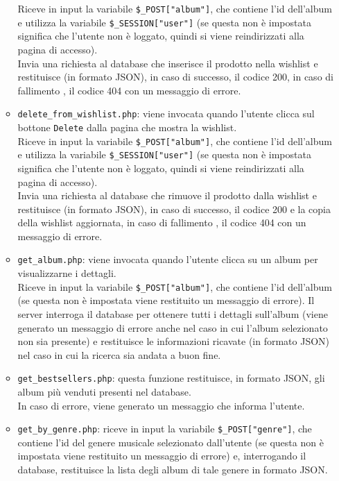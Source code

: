 \begin{itemize}
\begin{itemize}
            Riceve in input la variabile \texttt{\$\_POST["album"]}, che contiene l'id dell'album e utilizza la variabile \texttt{\$\_SESSION["user"]} (se questa non è impostata significa che l'utente non è loggato, quindi si viene reindirizzati alla pagina di accesso).\\
            Invia una richiesta al database che inserisce il prodotto nella wishlist e restituisce (in formato JSON), in caso di successo, il codice 200, in caso di fallimento , il codice 404 con un messaggio di errore.
            \item \texttt{delete\_from\_wishlist.php}: viene invocata quando l'utente clicca sul bottone \texttt{Delete} dalla pagina che mostra la wishlist.\\
             Riceve in input la variabile \texttt{\$\_POST["album"]}, che contiene l'id dell'album e utilizza la variabile \texttt{\$\_SESSION["user"]} (se questa non è impostata significa che l'utente non è loggato, quindi si viene reindirizzati alla pagina di accesso).\\
            Invia una richiesta al database che rimuove il prodotto dalla wishlist e restituisce (in formato JSON), in caso di successo, il codice 200 e la copia della wishlist aggiornata, in caso di fallimento , il codice 404 con un messaggio di errore.
            \item \texttt{get\_album.php}: viene invocata quando l'utente clicca su un album per visualizzarne i dettagli.\\
            Riceve in input la variabile \texttt{\$\_POST["album"]}, che contiene l'id dell'album (se questa non è impostata viene restituito un messaggio di errore). 
            Il server interroga il database per ottenere tutti i dettagli sull'album (viene generato un messaggio di errore anche nel caso in cui l'album selezionato non sia presente) e restituisce le informazioni ricavate (in formato JSON) nel caso in cui la ricerca sia andata a buon fine.
            \item \texttt{get\_bestsellers.php}: questa funzione restituisce, in formato JSON, gli album più venduti presenti nel database.\\
            In caso di errore, viene generato un messaggio che informa l'utente.
            \item \texttt{get\_by\_genre.php}: riceve in input la variabile \texttt{\$\_POST["genre"]}, che contiene l'id del genere musicale selezionato dall'utente (se questa non è impostata viene restituito un messaggio di errore) e, interrogando il database, restituisce la lista degli album di tale genere in formato JSON.\\

\end{itemize}
\end{itemize}
